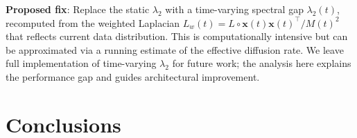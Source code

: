 \documentclass[review,12pt]{elsarticle}
\newcommand{\bfx}{\mathbf{x}}
\newcommand{\lambdat}{\lambda_2}
\begin{document}
\textbf{Proposed fix}: Replace the static $\lambdat$ with a time-varying
spectral gap $\lambdat(t)$, recomputed from the weighted Laplacian
$L_w(t) = L \circ \bfx(t)\bfx(t)^\top / M(t)^2$ that reflects current
data distribution. This is computationally intensive but can be approximated
via a running estimate of the effective diffusion rate. We leave full
implementation of time-varying $\lambdat$ for future work; the analysis
here explains the performance gap and guides architectural improvement.

\section{Conclusions}
\label{sec:conclusions}
\end{document}
